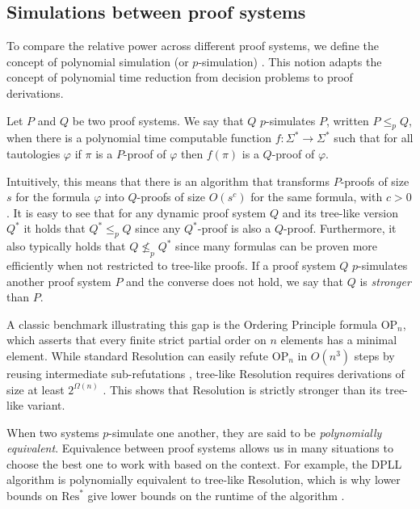 \subsection{Simulations between proof systems}
\label{sec:simulations}
To compare the relative power across different proof systems, we define the concept of polynomial simulation (or $p$-simulation) \cite{cook_proof_compx}. This notion adapts the concept of polynomial time reduction from decision problems to proof derivations.

\begin{definition}[$p$-simulation]
    Let $P$ and $Q$ be two proof systems. We say that $Q$ $p$-simulates $P$, written $P \leq_p Q$, when there is a polynomial time computable function $f : \Sigma^* \to \Sigma^*$ such that for all tautologies $\varphi$ if $\pi$ is a $P$-proof of $\varphi$ then $f(\pi)$ is a $Q$-proof of $\varphi$.
\end{definition}

Intuitively, this means that there is an algorithm that transforms $P$-proofs of size $s$ for the formula $\varphi$ into $Q$-proofs of size $O(s^c)$ for the same formula, with $c > 0$. It is easy to see that for any dynamic proof system $Q$ and its tree-like version $Q^*$ it holds that $Q^* \leq_p Q$ since any $Q^*$-proof is also a $Q$-proof. Furthermore, it also typically holds that $Q \not\leq_p Q^*$ since many formulas can be proven more efficiently when not restricted to tree-like proofs. If a proof system $Q$ $p$-simulates another proof system $P$ and the converse does not hold, we say that $Q$ is \textit{stronger} than $P$. 

A classic benchmark illustrating this gap is the Ordering Principle formula $\mathrm{OP}_n$, which asserts that every finite strict partial order on $n$ elements has a minimal element. While standard Resolution can easily refute $\mathrm{OP}_n$ in $O(n^3)$ steps by reusing intermediate sub-refutations \cite{op_upper}, tree-like Resolution requires derivations of size at least $2^{\Omega(n)}$ \cite{separation_res*_res}. This shows that Resolution is strictly stronger than its tree-like variant.

When two systems $p$-simulate one another, they are said to be \textit{polynomially equivalent}. Equivalence between proof systems allows us in many situations to choose the best one to work with based on the context. For example, the DPLL algorithm is polynomially equivalent to tree-like Resolution, which is why lower bounds on $\mathrm{Res}^*$ give lower bounds on the runtime of the algorithm \cite{dpll}.

